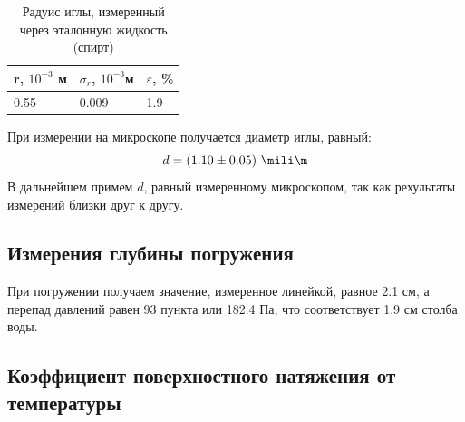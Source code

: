 \documentclass[a4paper,12pt]{article}
\begin{document}
\begin{table}[h!]
    \caption{Радуис иглы, измеренный через эталонную жидкость (спирт)}
    \label{радиус_спирт}
    \begin{tabular}{|l|l|l|}
        \hline
        r, $10^{-3}$ м & $\sigma_r$,  $10^{-3}$м & $\varepsilon$, \% \\ \hline
        0.55           & 0.009                   & 1.9               \\ \hline
    \end{tabular}
\end{table}

При измерении на микроскопе получается диаметр иглы, равный:
\begin{equation}
    d = (1.10 \pm 0.05 )\ \mili \m
\end{equation}
В дальнейшем примем $d$, равный измеренному микроскопом, так как рехультаты измерений близки друг к другу.

\subsection*{Измерения глубины погружения}
При погружении получаем значение, измеренное линейкой, равное 2.1 см, а перепад давлений равен 93 пункта или 182.4 Па, что соответствует 1.9 см столба воды.

\subsection*{Коэффициент поверхностного натяжения от температуры}
\end{document}
